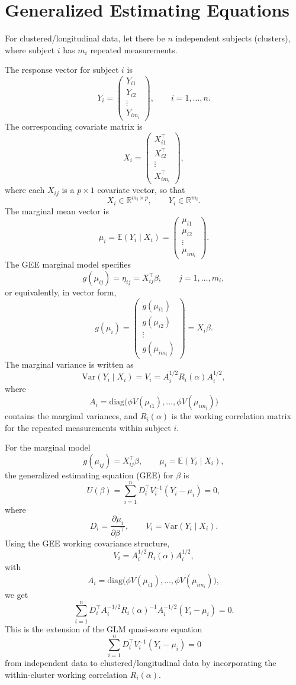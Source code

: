 \documentclass[11pt]{article}
\theoremstyle{definition}
\begin{document}
\section{Generalized Estimating Equations}
For clustered/longitudinal data, let there be \(n\) independent subjects (clusters), where subject \(i\) has \(m_i\) repeated measurements.

The response vector for subject \(i\) is
\[
Y_i =
\begin{pmatrix}
Y_{i1}\\
Y_{i2}\\
\vdots\\
Y_{im_i}
\end{pmatrix},
\qquad i=1,\dots,n.
\]
The corresponding covariate matrix is
\[
X_i =
\begin{pmatrix}
X_{i1}^\top\\
X_{i2}^\top\\
\vdots\\
X_{im_i}^\top
\end{pmatrix},
\]
where each \(X_{ij}\) is a \(p\times 1\) covariate vector, so that
\[
X_i \in \mathbb{R}^{m_i\times p},
\qquad
Y_i \in \mathbb{R}^{m_i}.
\]
The marginal mean vector is
\[
\mu_i = \mathbb{E}(Y_i \mid X_i)
=
\begin{pmatrix}
\mu_{i1}\\
\mu_{i2}\\
\vdots\\
\mu_{im_i}
\end{pmatrix}.
\]
The GEE marginal model specifies
\[
g(\mu_{ij}) =\eta_{ij}= X_{ij}^\top \beta,
\qquad j=1,\dots,m_i,
\]
or equivalently, in vector form,
\[
g(\mu_i)=
\begin{pmatrix}
g(\mu_{i1})\\
g(\mu_{i2})\\
\vdots\\
g(\mu_{im_i})
\end{pmatrix}
= X_i \beta.
\]
The marginal variance is written as
\[
\mathrm{Var}(Y_i\mid X_i)=V_i
=
A_i^{1/2} R_i(\alpha) A_i^{1/2},
\]
where
\[
A_i=\mathrm{diag}\!\bigl(\phi V(\mu_{i1}),\dots,\phi V(\mu_{im_i})\bigr)
\]
contains the marginal variances, and \(R_i(\alpha)\) is the working correlation matrix for the repeated measurements within subject \(i\).

For the marginal model
\[
g(\mu_{ij}) = X_{ij}^\top \beta,
\qquad
\mu_i = \mathbb{E}(Y_i\mid X_i),
\]
the generalized estimating equation (GEE) for \(\beta\) is
\[
U(\beta)
=
\sum_{i=1}^n D_i^\top V_i^{-1}(Y_i-\mu_i)=0,
\]
where
\[
D_i=\frac{\partial \mu_i}{\partial \beta^\top},
\qquad
V_i=\mathrm{Var}(Y_i\mid X_i).
\]
Using the GEE working covariance structure,
\[
V_i=A_i^{1/2}R_i(\alpha)A_i^{1/2},
\]
with
\[
A_i=\mathrm{diag}\!\bigl(\phi V(\mu_{i1}),\dots,\phi V(\mu_{im_i})\bigr),
\]
we get
\[
\sum_{i=1}^n
D_i^\top
A_i^{-1/2}R_i(\alpha)^{-1}A_i^{-1/2}
(Y_i-\mu_i)=0.
\]
This is the extension of the GLM quasi-score equation
\[
\sum_{i=1}^n D_i^\top V_i^{-1}(Y_i-\mu_i)=0
\]
from independent data to clustered/longitudinal data by incorporating the within-cluster working correlation \(R_i(\alpha)\).
\end{document}
